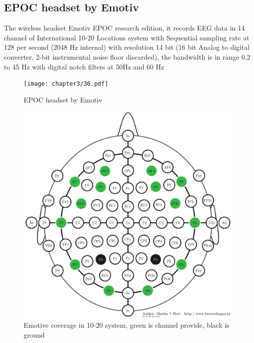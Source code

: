 \subsection{EPOC headset by Emotiv\texttrademark\cite{ref12}}

\hspace{1.5cm} The wireless headset Emotiv EPOC research edition, it records EEG data in 14 channel of International 10-20 Locations system with Sequential sampling rate at 128 per second (2048 Hz internal) with resolution 14 bit (16 bit Analog to digital converter, 2-bit instrumental noise floor discarded), the bandwidth is in range 0.2 to 45 Hz with digital notch filters at 50Hz and 60 Hz

\begin{figure}[ht]
	\centering
	\texttt{[image: chapter3/36.pdf]}
	\caption{EPOC headset by Emotiv\texttrademark}
\end{figure}

\begin{figure}[ht]
	\centering
	\includegraphics[scale = 0.4]{chapter3/emotiv_electrodes_cover.pdf}
	\caption{Emotive coverage in 10-20 system, green is channel provide, black is ground}
\end{figure}

